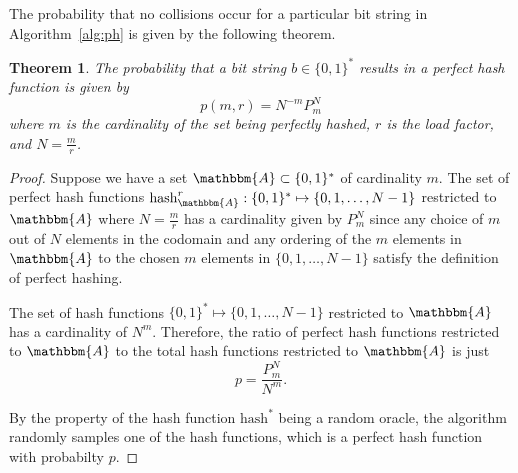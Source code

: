 \documentclass[hidelinks,11pt,final]{article}
\newcommand{\envnumstyle}{section}
\theoremstyle{plain}
\newtheorem{theorem}{Theorem}[\envnumstyle]
\begin{document}
The probability that no collisions occur for a particular bit string in Algorithm~\ref{alg:ph} is given by the following theorem.
\begin{theorem}
The probability that a bit string $b \in \{0,1\}^{*}$ results in a perfect hash function is given by
\begin{equation}
\label{eq:p_m_N}
	p(m,r) = N^{-m} P^{N}_{m}
\end{equation}
where $m$ is the cardinality of the set being perfectly hashed, $r$ is the load factor, and $N = \frac{m}{r}$.
\end{theorem}
\begin{proof}
Suppose we have a set $\mathbbm{A} \subset \{0,1\}^*$ of cardinality $m$.
The set of perfect hash functions $\mathrm{hash}_{\mathbbm{A}}^{r} : \{0,1\}^* \mapsto \{0,1,\ldots,N-1\}$ restricted to $\mathbbm{A}$ where $N = \frac{m}{r}$ has a cardinality given by $P^{N}_{m}$ since any choice of $m$ out of $N$ elements in the codomain and any ordering of the $m$ elements in $\mathbbm{A}$ to the chosen $m$ elements in $\{0,1,\ldots,N-1\}$ satisfy the definition of perfect hashing.


The set of hash functions $\{0,1\}^* \mapsto \{0,1,\ldots,N-1\}$ restricted to $\mathbbm{A}$ has a cardinality of $N^m$.
Therefore, the ratio of perfect hash functions restricted to $\mathbbm{A}$ to the total hash functions restricted to $\mathbbm{A}$ is just
\begin{equation}
	p = \frac{P^{N}_{m}}{N^m}.
\end{equation}

By the property of the hash function $\mathrm{hash}^*$ being a random oracle, the algorithm randomly samples one of the hash functions, which is a perfect hash function with probabilty $p$.

	

\end{proof}
\end{document}
